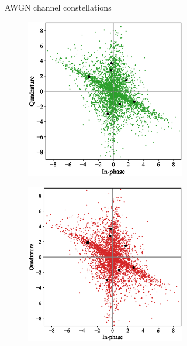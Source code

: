 \begin{figure}[tp!]
\begin{subfigure}{0.325\linewidth}
\begin{subfigure}{0.48\textwidth}
		\end{subfigure}
		\caption{AWGN channel constellations}
		\label{fig:awgn_constellation}
	\end{subfigure}
	\begin{subfigure}{0.325\linewidth}
		\begin{subfigure}{0.48\textwidth}
			\includegraphics[width=\linewidth]{figs/rayleigh_normal_constellation}
		\end{subfigure}
		\hfill
		\begin{subfigure}{0.48\textwidth}
			\includegraphics[width=\linewidth]{figs/rayleigh_covert_constellation}

\end{subfigure}
\end{subfigure}
\end{figure}
